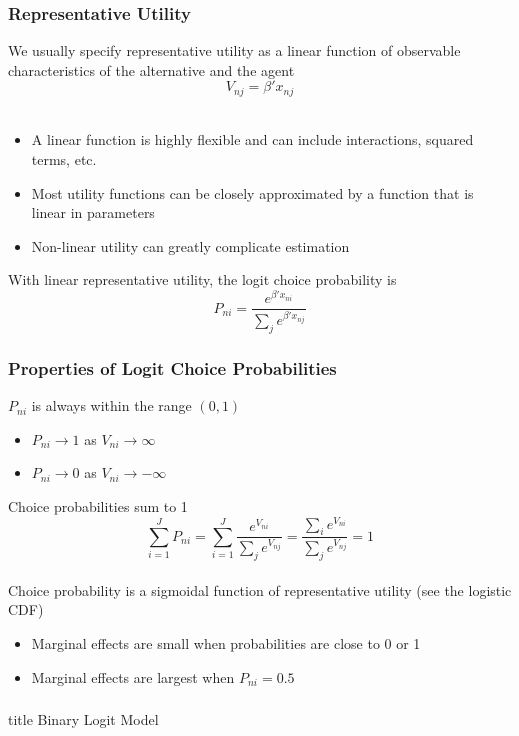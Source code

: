 \documentclass{beamer}
\begin{document}
\begin{frame}\frametitle{Representative Utility}
    We usually specify representative utility as a linear function of observable characteristics of the alternative and the agent
    $$V_{nj} = \beta' x_{nj}$$ \\
    \begin{itemize}
    	\item A linear function is highly flexible and can include interactions, squared terms, etc.
    	\item Most utility functions can be closely approximated by a function that is linear in parameters
    	\item Non-linear utility can greatly complicate estimation
    \end{itemize}
    \vspace{3ex}
    With linear representative utility, the logit choice probability is
    $$P_{ni} = \frac{e^{\beta' x_{ni}}}{\sum_j e^{\beta' x_{nj}}}$$
\end{frame}

\begin{frame}\frametitle{Properties of Logit Choice Probabilities}
    $P_{ni}$ is always within the range $(0, 1)$
    \begin{itemize}
    	\item $P_{ni} \rightarrow 1$ as $V_{ni} \rightarrow \infty$
    	\item $P_{ni} \rightarrow 0$ as $V_{ni} \rightarrow -\infty$
    \end{itemize}
    \vspace{2ex}
    Choice probabilities sum to 1
    $$\sum_{i = 1}^J P_{ni} = \sum_{i = 1}^J \frac{e^{V_{ni}}}{\sum_j e^{V_{nj}}} =\frac{\sum_i e^{V_{ni}}}{\sum_j e^{V_{nj}}} = 1$$ \\
    \vspace{2ex}
    Choice probability is a sigmoidal function of representative utility (see the logistic CDF)
    \begin{itemize}
    	\item Marginal effects are small when probabilities are close to 0 or 1
    	\item Marginal effects are largest when $P_{ni} = 0.5$
    \end{itemize}
\end{frame}

\begin{frame}\frametitle{}
    \vfill
    \centering
    \begin{beamercolorbox}[center]{title}
        \Large Binary Logit Model
    \end{beamercolorbox}
    \vfill
\end{frame}
\end{document}
